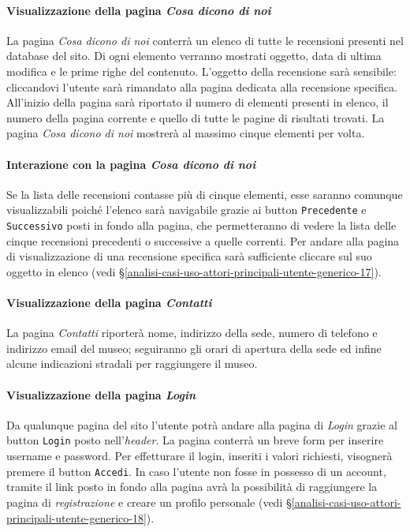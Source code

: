 \paragraph{Visualizzazione della pagina \textit{Cosa dicono di noi}}
\label{analisi-casi-uso-attori-principali-utente-generico-8}
La pagina \textit{Cosa dicono di noi} conterrà un elenco di tutte le recensioni presenti nel database del sito. Di ogni elemento verranno mostrati oggetto, data di ultima modifica e le prime righe del contenuto. L'oggetto della recensione sarà sensibile: cliccandovi l'utente sarà rimandato alla pagina dedicata alla recensione specifica. All'inizio della pagina sarà riportato il numero di elementi presenti in elenco, il numero della pagina corrente e quello di tutte le pagine di risultati trovati. La pagina \textit{Cosa dicono di noi} mostrerà al massimo cinque elementi per volta.


\paragraph{Interazione con la pagina \textit{Cosa dicono di noi}}
\label{analisi-casi-uso-attori-principali-utente-generico-9}
Se la lista delle recensioni contasse più di cinque elementi, esse saranno comunque visualizzabili poiché l'elenco sarà navigabile grazie ai button \texttt{Precedente} e \texttt{Successivo} posti in fondo alla pagina, che permetteranno di vedere la lista delle cinque recensioni precedenti o successive a quelle correnti. Per andare alla pagina di visualizzazione di una recensione specifica sarà sufficiente cliccare sul suo oggetto in elenco (vedi §\ref{analisi-casi-uso-attori-principali-utente-generico-17}).


\paragraph{Visualizzazione della pagina \textit{Contatti}}
\label{analisi-casi-uso-attori-principali-utente-generico-10}
La pagina \textit{Contatti} riporterà nome, indirizzo della sede, numero di telefono e indirizzo email del museo; seguiranno gli orari di apertura della sede ed infine alcune indicazioni stradali per raggiungere il museo.


\paragraph{Visualizzazione della pagina \textit{Login}}
\label{analisi-casi-uso-attori-principali-utente-generico-11}
Da qualunque pagina del sito l'utente potrà andare alla pagina di \textit{Login} grazie al button \texttt{Login} posto nell'\textit{header}. La pagina conterrà un breve form per inserire username e password. Per effetturare il login, inseriti i valori richiesti, visognerà premere il button \texttt{Accedi}. In caso l'utente non fosse in possesso di un account, tramite il link posto in fondo alla pagina avrà la possibilità di raggiungere la pagina di \textit{registrazione} e creare un profilo personale (vedi §\ref{analisi-casi-uso-attori-principali-utente-generico-18}).


